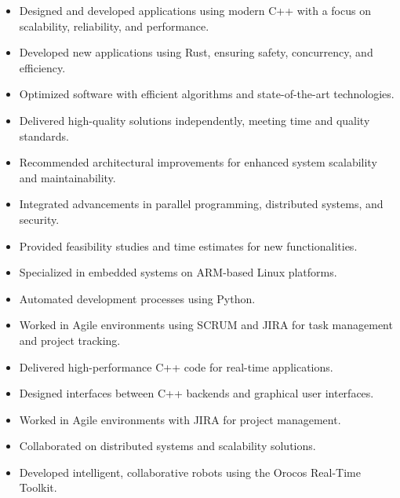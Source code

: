 \documentclass[10pt,a4paper,ragged2e,withhyper]{altacv}
\begin{document}
\begin{paracol}{2}


	\begin{itemize}
		\item Designed and developed applications using modern C++ with a focus on scalability, reliability, and performance.
		\item Developed new applications using Rust, ensuring safety, concurrency, and efficiency.
		\item Optimized software with efficient algorithms and state-of-the-art technologies.
		\item Delivered high-quality solutions independently, meeting time and quality standards.
		\item Recommended architectural improvements for enhanced system scalability and maintainability.
		\item Integrated advancements in parallel programming, distributed systems, and security.
		\item Provided feasibility studies and time estimates for new functionalities.
		\item Specialized in embedded systems on ARM-based Linux platforms.
		\item Automated development processes using Python.
		\item Worked in Agile environments using SCRUM and JIRA for task management and project tracking.
	\end{itemize}

	\divider

	\begin{itemize}
		\item Delivered high-performance C++ code for real-time applications.
		\item Designed interfaces between C++ backends and graphical user interfaces.
		\item Worked in Agile environments with JIRA for project management.
		\item Collaborated on distributed systems and scalability solutions.
		\item Developed intelligent, collaborative robots using the Orocos Real-Time Toolkit.
	\end{itemize}


\end{paracol}
\end{document}
